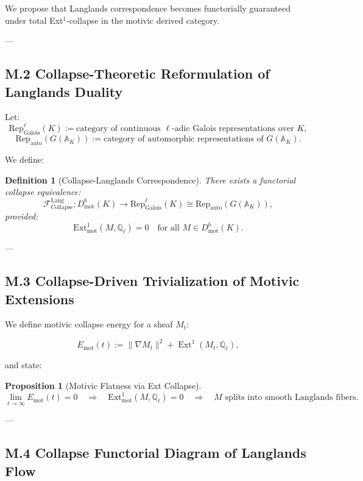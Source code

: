 \documentclass[11pt]{article}
\newtheorem{definition}[theorem]{Definition}
\newtheorem{proposition}[theorem]{Proposition}
\begin{document}
We propose that Langlands correspondence becomes functorially guaranteed under total Ext$^1$-collapse in the motivic derived category.

---

\subsection*{M.2 Collapse-Theoretic Reformulation of Langlands Duality}

Let:
\[
\mathrm{Rep}_\mathrm{Galois}^\ell(K) := \text{category of continuous } \ell\text{-adic Galois representations over } K,
\]
\[
\mathrm{Rep}_\mathrm{auto}(G(\mathbb{A}_K)) := \text{category of automorphic representations of } G(\mathbb{A}_K).
\]

We define:

\begin{definition}[Collapse-Langlands Correspondence]
There exists a functorial collapse equivalence:
\[
\mathcal{F}_{\mathrm{Collapse}}^{\mathrm{Lang}} :
D^b_{\mathrm{mot}}(K) \to \mathrm{Rep}_\mathrm{Galois}^\ell(K) \cong \mathrm{Rep}_\mathrm{auto}(G(\mathbb{A}_K)),
\]
provided:
\[
\mathrm{Ext}^1_{\mathrm{mot}}(M, \mathbb{Q}_\ell) = 0
\quad \text{for all } M \in D^b_{\mathrm{mot}}(K).
\]
\end{definition}

---

\subsection*{M.3 Collapse-Driven Trivialization of Motivic Extensions}

We define motivic collapse energy for a sheaf $M_t$:

\[
E_{\mathrm{mot}}(t) := \|\nabla M_t\|^2 + \operatorname{Ext}^1(M_t, \mathbb{Q}_\ell),
\]

and state:

\begin{proposition}[Motivic Flatness via Ext Collapse]
\[
\lim_{t \to \infty} E_{\mathrm{mot}}(t) = 0
\quad \Rightarrow \quad
\mathrm{Ext}^1_{\mathrm{mot}}(M, \mathbb{Q}_\ell) = 0
\quad \Rightarrow \quad
M \text{ splits into smooth Langlands fibers}.
\]
\end{proposition}

---

\subsection*{M.4 Collapse Functorial Diagram of Langlands Flow}
\end{document}
